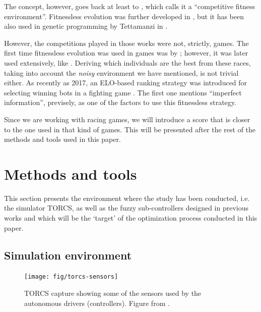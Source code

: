 \documentclass[10pt,journal,compsoc]{IEEEtran}
\begin{document}
The concept, however, goes back at least to
\cite{Angeline:1993:CEE:645513.657590}, which calls it a ``competitive
fitness environment''. Fitnessless evolution was further developed in
\cite{rosin1995methods}, but it has been also used in genetic
programming by Tettamanzi in \cite{tettamanzi1996genetic}.

However, the competitions played in those works were not, strictly,
games. The first time fitnessless evolution was used in  games was by
\cite{luke1998genetic}; however, it was later used extensively, like
\cite{Jaskowski2008,10.1007/978-3-540-78671-9_2,alhejali2011using,DBLP:conf/evoW/Fernandez-AresG16}. Deriving which individuals are the best from these races, taking into account
the {\em noisy} environment we have mentioned, is not trivial
either. As recently as 2017, an ELO-based ranking strategy was
introduced for selecting winning bots in a fighting game
\cite{7792145}. The first one mentions ``imperfect information'',
previsely, as one of the factors to use this fitnessless strategy.

Since we are working with racing games, we will introduce a score that
is closer to the one used in that kind of games. This will be
presented after the rest of the methods and tools used in this paper. 



\section{Methods and tools}
\label{sec:methods}

This section presents the environment where the study has been conducted, i.e. the simulator TORCS, as well as the fuzzy sub-controllers designed in previous works and which will be the `target' of the optimization process conducted in this paper. 

%
\subsection{Simulation environment}

\begin{figure}[!ht] 
	\begin{center}
		\texttt{[image: fig/torcs-sensors]}
		\caption {TORCS capture showing some of the sensors
                used by the autonomous drivers (controllers). Figure from \cite{DBLP:conf/cig/SalemMG19}.}
		\label{fig:torcs-sensors}
	\end{center}
\end{figure}
\end{document}
